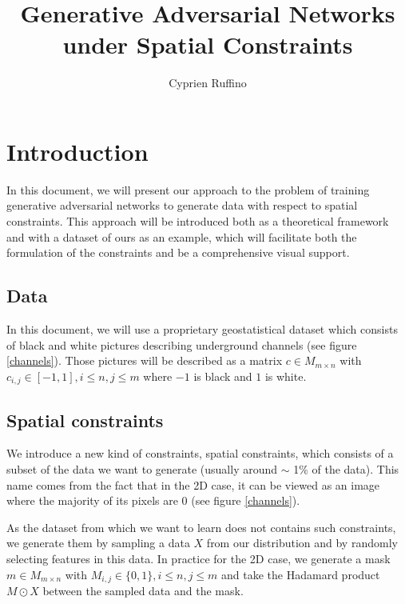 \documentclass{article}
\begin{document}
\title{Generative Adversarial Networks under Spatial Constraints}
\author{Cyprien  Ruffino}
\maketitle

\section{Introduction}

	In this document, we will present our approach to the problem of training generative adversarial networks to generate data with respect to spatial constraints. This approach will be introduced both as a theoretical framework and with a dataset of ours as an example, which will facilitate both the formulation of the constraints and be a comprehensive visual support.
	
	
	\subsection{Data}
	
		In this document, we will use a proprietary geostatistical dataset which consists of black and white pictures describing underground channels (see figure \ref{channels}). Those pictures will be described as a matrix $c \in M_{m\times n}$ with $c_{i,j} \in [-1, 1], i \leq n, j \leq m $ where $-1$ is black and $1$ is white. 
	
	
	\subsection{Spatial constraints}
		\label{constraints}
		
		We introduce a new kind of constraints, spatial constraints, which consists of a subset of the data we want to generate (usually around $\sim$ 1\% of the data). This name comes from the fact that in the 2D case, it can be viewed as an image where the majority of its pixels are $0$ (see figure \ref{channels}).
		
		As the dataset from which we want to learn does not contains such constraints, we generate them by sampling a data $X$ from our distribution and by randomly selecting features in this data. In practice for the 2D case, we generate a mask $m \in  M_{m\times n}$ with $M_{i,j} \in \{0, 1\}, i \leq n, j \leq m $ and take the Hadamard product $M\odot X$ between the sampled data and the mask.
	
\end{document}
